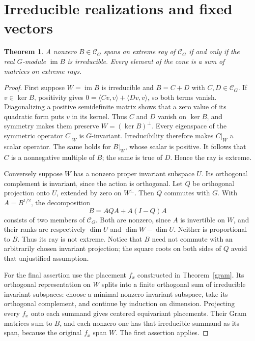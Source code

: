 \documentclass[11pt,a4paper]{article}
\newtheorem{theorem}{Theorem}
\newcommand{\im}{\operatorname{im}}
\begin{document}
\section{Irreducible realizations and fixed vectors}
\begin{theorem}\label{extreme}
A nonzero $B\in\mathcal C_G$ spans an extreme ray of $\mathcal C_G$ if and
only if the real $G$-module $\im B$ is irreducible. Every element of the
cone is a sum of matrices on extreme rays.
\end{theorem}
\begin{proof}
First suppose $W=\im B$ is irreducible and $B=C+D$ with
$C,D\in\mathcal C_G$. If $v\in\ker B$, positivity gives
$0=\langle Cv,v\rangle+\langle Dv,v\rangle$, so both terms vanish.
Diagonalizing a positive semidefinite matrix shows that a zero value of
its quadratic form puts $v$ in its kernel. Thus $C$ and $D$ vanish on
$\ker B$, and symmetry makes them preserve $W=(\ker B)^\perp$.
Every eigenspace of the symmetric operator $C|_W$ is $G$-invariant.
Irreducibility therefore makes $C|_W$ a scalar operator. The same holds
for $B|_W$, whose scalar is positive. It follows that $C$ is a nonnegative
multiple of $B$; the same is true of $D$. Hence the ray is extreme.

Conversely suppose $W$ has a nonzero proper invariant subspace $U$.
Its orthogonal complement is invariant, since the action is orthogonal.
Let $Q$ be orthogonal projection onto $U$, extended by zero on $W^\perp$.
Then $Q$ commutes with $G$. With $A=B^{1/2}$, the decomposition
\[
 B=AQA+A(I-Q)A
\]
consists of two members of $\mathcal C_G$. Both are nonzero, since $A$
is invertible on $W$, and their ranks are respectively $\dim U$ and
$\dim W-\dim U$. Neither is proportional to $B$. Thus its ray is not
extreme. Notice that $B$ need not commute with an arbitrarily chosen
invariant projection; the square roots on both sides of $Q$ avoid that
unjustified assumption.

For the final assertion use the placement $f_x$ constructed in
Theorem~\ref{gram}. Its orthogonal representation on $W$ splits into a
finite orthogonal sum of irreducible invariant subspaces: choose a
minimal nonzero invariant subspace, take its orthogonal complement,
and continue by induction on dimension. Projecting every $f_x$ onto
each summand gives centered equivariant placements. Their Gram matrices
sum to $B$, and each nonzero one has that irreducible summand as its
span, because the original $f_x$ span $W$. The first assertion applies.
\end{proof}
\end{document}

